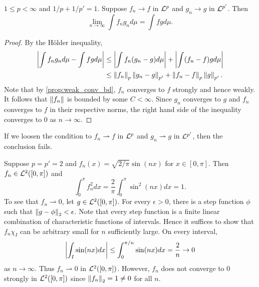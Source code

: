 \begin{proposition}
    $1\leq p<\infty$ and $1/p+1/p'=1$. Suppose $f_n\to f$ in $\mathcal{L}^p$ 
    and $g_n\to g$ in $\mathcal{L}^{p'}$. Then 
    \begin{equation*}
        \lim_{n\to\infty}\int f_ng_nd\mu = \int fg d\mu.
    \end{equation*}
\end{proposition}
\begin{proof}
    By the H\"older inequality, 
    \begin{equation*}
        \begin{split}
            \left\lvert {\int f_ng_nd\mu - \int fgd\mu} \right\rvert 
            &\leq \left\lvert {\int f_n(g_n-g)d\mu} \right\rvert + \left\lvert {\int (f_n-f)gd\mu} \right\rvert \\
            &\leq \left\lVert {f_n} \right\rVert_p\left\lVert {g_n-g} \right\rVert_{p'} + \left\lVert {f_n-f} \right\rVert_p\left\lVert {g} \right\rVert_{p'}.
        \end{split}
    \end{equation*}
    Note that by \cref{prop:weak_conv_bd}, $f_n$ converges 
    to $f$ strongly and hence weakly. It follows that $\left\lVert {f_n} \right\rVert$ 
    is bounded by some $C<\infty$. Since $g_n$ converges to $g$ 
    and $f_n$ converges to $f$ in their respective norms, the 
    right hand side of the inequality converges to $0$ as $n\to\infty$.
\end{proof}
\begin{remark}
    If we loosen the condition to $f_n\rightharpoonup f$ in $\mathcal{L}^p$ 
    and $g_n\rightharpoonup g$ in $\mathcal{L}^{p'}$, then the conclusion 
    fails.
\end{remark}
\begin{example}
    Suppose $p=p'=2$ and $f_n(x) = \sqrt{2/\pi}\sin(nx)$ for 
    $x\in[0,\pi]$. Then $f_n\in\mathcal{L}^2([0,\pi])$ and 
    \begin{equation*}
        \int_0^\pi f_n^2dx = \frac{2}{\pi}\int_0^\pi \sin^2(nx)dx = 1.
    \end{equation*}
    To see that $f_n \rightharpoonup 0$, let $g\in\mathcal{L}^2([0,\pi])$. 
    For every $\epsilon>0$, there is a step function $\phi$ such 
    that $\left\lVert {g-\phi} \right\rVert_2<\epsilon$. Note that every step function 
    is a finite linear combination of characteristic functions of 
    intervals. Hence it suffices to show that $f_n\chi_I$ can be 
    arbitrary small for $n$ sufficiently large. On every interval, 
    \begin{equation*}
        \left\lvert {\int_I \sin(nx)dx} \right\rvert \leq \int_{0}^{\pi/n}\sin(nx)dx 
        = \frac{2}{n}\to 0
    \end{equation*}
    as $n\to\infty$. Thus $f_n\rightharpoonup 0$ in $\mathcal{L}^2([0,\pi])$. 
    However, $f_n$ does not converge to $0$ strongly in $\mathcal{L}^2([0,\pi])$ 
    since $\left\lVert {f_n} \right\rVert_2 = 1\neq 0$ for all $n$.
\end{example}

